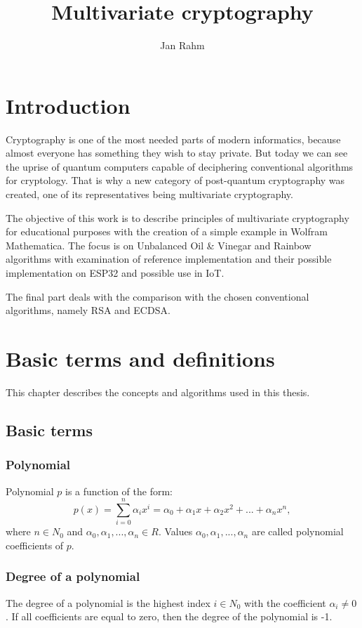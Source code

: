 \documentclass[thesis=M,english]{FITthesis}[2019/12/23]
\title{Multivariate cryptography}
\author{Jan Rahm} %
\begin{document}

\chapter{Introduction}
Cryptography is one of the most needed parts of modern informatics, because almost everyone has something they wish to stay private. But today we can see the uprise of quantum computers capable of deciphering conventional algorithms for cryptology. That is why a new category of post-quantum cryptography was created, one of its representatives being multivariate cryptography.

The objective of this work is to describe principles of multivariate cryptography for educational purposes with the creation of a simple example in Wolfram Mathematica. The focus is on Unbalanced Oil \& Vinegar and Rainbow algorithms with examination of reference implementation and their possible implementation on ESP32 and possible use in IoT.

The final part deals with the comparison with the chosen conventional algorithms, namely RSA and ECDSA. 

\chapter{Basic terms and definitions}
This chapter describes the concepts and algorithms used in this thesis.

\section{Basic terms}
\subsection{Polynomial}
Polynomial $p$ is a function of the form:
\[
p(x) = \sum\limits_{i=0}^n {\alpha_ix^i} = \alpha_0 + \alpha_1x + \alpha_2x^2 + ... + \alpha_nx^n,
\]
where $n \in N_0$ and $\alpha_0, \alpha_1, ..., \alpha_n \in R$. Values $\alpha_0, \alpha_1, ..., \alpha_n$ are called polynomial coefficients of $p$.

\subsection{Degree of a polynomial}
The degree of a polynomial is the highest index $i \in N_0$ with the coefficient $\alpha_i \ne 0$. If all coefficients are equal to zero, then the degree of the polynomial is -1.
\end{document}
